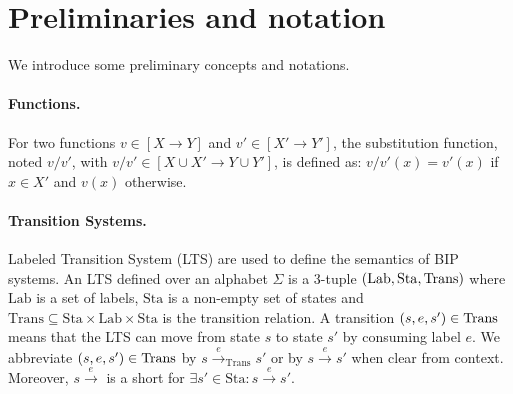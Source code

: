 %
\section{Preliminaries and notation}
\label{sec:prelim}
%

We introduce some preliminary concepts and notations.
%
\paragraph{Functions.} For two functions $v\in [ X \rightarrow Y]$ and $v'\in [X' \rightarrow Y']$, the substitution function, noted $v/v'$, with $v/v' \in [X \cup X' \rightarrow Y \cup Y']$, is defined as: $v/v'(x) = v'(x)$ if $x \in X'$ and $v(x)$ otherwise.
%



\paragraph{Transition Systems.}
%
Labeled Transition System (LTS) are used to define the semantics of BIP systems.
An LTS defined over an alphabet $\Sigma$ is a 3-tuple $(\mathrm{Lab},\mathrm{Sta},\mathrm{Trans})$ where $\mathrm{Lab}$ is a set of labels, $\mathrm{Sta}$ is a non-empty set of states and $\mathrm{Trans}\subseteq \mathrm{Sta}\times \mathrm{Lab} \times \mathrm{Sta}$ is the transition relation.
A transition $(s,e,s')\in\mathrm{Trans}$ means that the LTS can move from state $s$ to state $s'$ by consuming label $e$.
We abbreviate $(s,e,s')\in\mathrm{Trans}$ by $s \stackrel{e}{\rightarrow}_\mathrm{Trans} s'$ or by $s\stackrel{e}{\rightarrow} s'$ when clear from context.
Moreover, $s \stackrel{e}{\rightarrow}$ is a short for $\exists s'\in\mathrm{Sta}: s\stackrel{e}{\rightarrow} s'$.
%
%
%
%


